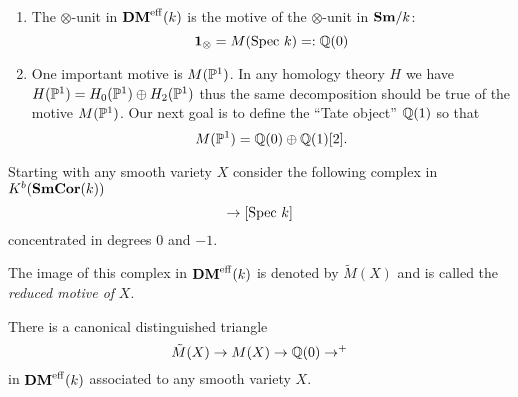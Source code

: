 \begin{exam}
  \begin{enumerate}\item 
    The $\otimes$-unit in $\mathbf{DM}^{\mathrm{eff}}(k)$ is the motive of the
    $\otimes$-unit in $\mathbf{Sm}/k$:
    \begin{equation*}
      \mathbf{1_{\otimes}} = M(\mathrm{Spec}~ k) =: \mathbb{Q}(0)
    \end{equation*}
  \item One important motive is $M(\mathbb{P}^1)$. In any homology theory $H$
    we have $H(\mathbb{P}^{1})=H_{0}(\mathbb{P}^{1})\oplus
    H_{2}(\mathbb{P}^{1})$ thus the same decomposition should be true of
    the motive $M(\mathbb{P}^{1})$. Our next goal is to define the ``Tate
    object'' $\mathbb{Q}(1)$ so that
    \begin{equation}
      \label{eq:9-p1-decomposition}
      M(\mathbb{P}^{1})=\mathbb{Q}(0)\oplus\mathbb{Q}(1)[2].
    \end{equation}
  \end{enumerate}
\end{exam}

Starting with any smooth variety $X$ consider the following complex in 
$K^b(\mathbf{SmCor}(k))$
\begin{equation*}
  [X]\to [\spec k]
\end{equation*}
concentrated in degrees $0$ and $-1$.
\begin{defn}
  The image of this complex in $\mathbf{DM}^{\mathrm{eff}}(k)$ is denoted by
  $\tilde{M}(X)$ and is called the \emph{reduced motive of} $X$.
\end{defn}

\begin{rem}
  There is a canonical distinguished triangle
  \begin{equation*}
    \tilde{M}(X)\to M(X)\to\mathbb{Q}(0)\to^{+}
  \end{equation*}
  in $\mathbf{DM}^{\mathrm{eff}}(k)$ associated to any smooth variety $X$.
\end{rem}

